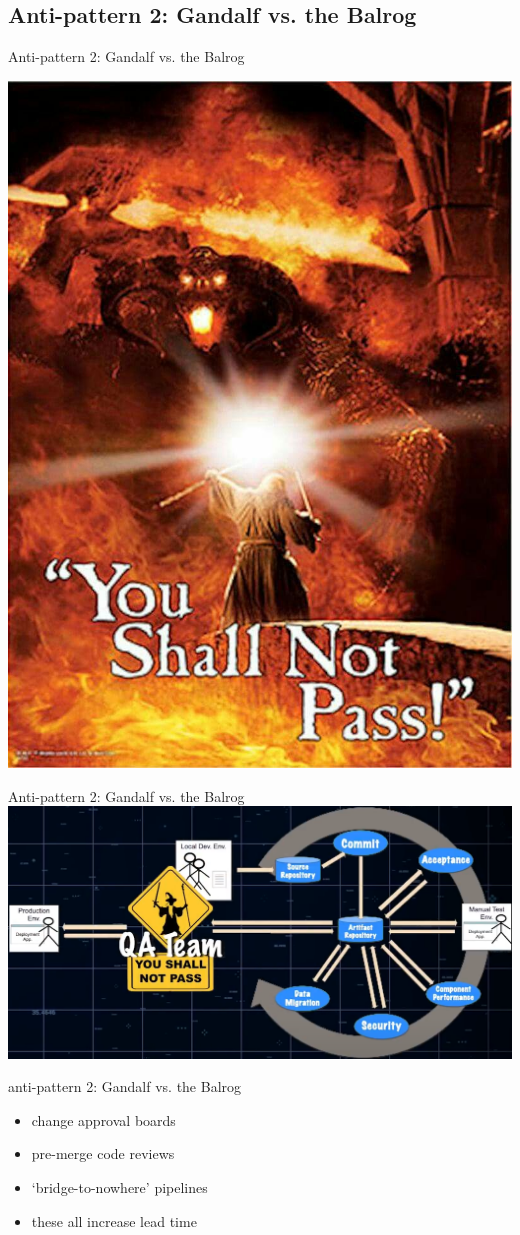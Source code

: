 \documentclass{beamer}
\begin{document}
	\subsection{Anti-pattern 2: Gandalf vs. the Balrog}
	\begin{frame}{Anti-pattern 2: Gandalf vs. the Balrog}
		\begin{center}
			\includegraphics[width=.5\textwidth]{gandalf-balrog}
		\end{center}
	\end{frame}
	\begin{frame}{Anti-pattern 2: Gandalf vs. the Balrog}
		\includegraphics[width=\textwidth]{gandalf}
	\end{frame}
	\begin{frame}{anti-pattern 2: Gandalf vs. the Balrog}
		\begin{itemize}
			\item change approval boards \pause 
			\item pre-merge code reviews \pause 
			\item `bridge-to-nowhere' pipelines \pause
			\item these all increase lead time
		\end{itemize}
	\end{frame}
\end{document}
